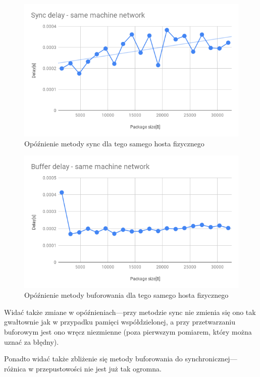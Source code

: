 \documentclass[11pt]{article}
\begin{document}
    \begin{figure}[H]
        \includegraphics[width=1\textwidth,frame]{charts/Sync delay - same machine network.png}
        \caption{Opóźnienie metody sync dla tego samego hosta fizycznego}
        \label{fig:sync-same-delay}
    \end{figure}
    \begin{figure}[H]
        \includegraphics[width=1\textwidth,frame]{charts/Buffer delay - same machine network.png}
        \caption{Opóźnienie metody buforowania dla tego samego hosta fizycznego}
        \label{fig:buff-same-delay}
    \end{figure}

    Widać także zmiane w opóźnieniach---przy metodzie sync nie zmienia się ono tak gwałtownie jak w przypadku
    pamięci współdzielonej, a przy przetwarzaniu buforowym jest ono wręcz niezmienne (poza pierwszym pomiarem,
    który można uznać za błędny).

    Ponadto widać także zbliżenie się metody buforowania do synchronicznej---różnica w przepustowości nie jest już tak ogromna.
\end{document}
